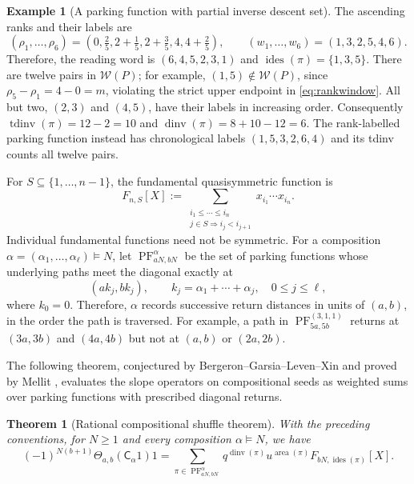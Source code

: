\documentclass[12pt,reqno]{amsart}
\numberwithin{equation}{section}
\newtheorem{theorem}{Theorem}[section]
\theoremstyle{definition}
\newtheorem*{example}{Example}
\theoremstyle{remark}
\theoremstyle{plain}
\DeclareMathOperator{\area}{area}
\DeclareMathOperator{\dinv}{dinv}
\DeclareMathOperator{\tdinv}{tdinv}
\DeclareMathOperator{\ides}{ides}
\newcommand{\Cop}{\mathsf C}
\begin{document}
\begin{example}[A parking function with partial inverse descent set]
\begin{table}[!htbp]
\caption{Labels and perturbed ranks in Figure~\ref{fig:parking}.  The rank index is the position in ascending rank order.}
\label{tab:parking}
\end{table}
\par
The ascending ranks and their labels are
\[
 (\rho_1,\ldots,\rho_6)=
 \left(0,\tfrac25,2+\tfrac15,2+\tfrac35,4,4+\tfrac25\right),
 \qquad (w_1,\ldots,w_6)=(1,3,2,5,4,6).
\]
Therefore, the reading word is $(6,4,5,2,3,1)$ and
$\ides(\pi)=\{1,3,5\}$.
There are twelve pairs in $\mathcal W(P)$; for example, $(1,5)\notin \mathcal W(P)$, since $\rho_5-\rho_1=4-0=m$, violating the strict upper endpoint in \eqref{eq:rankwindow}.  All but two, $(2,3)$ and $(4,5)$, have their labels in increasing order.
Consequently $\tdinv(\pi)=12-2=10$ and $\dinv(\pi)=8+10-12=6$.
The rank-labelled parking function instead has chronological labels
$(1,5,3,2,6,4)$ and its tdinv counts all twelve pairs.
\end{example}

For $S\subseteq\{1,\ldots,n-1\}$, the fundamental quasisymmetric function is
\[
 F_{n,S}[X]:=\sum_{\substack{i_1\le\cdots\le i_n\\j\in S\Rightarrow i_j<i_{j+1}}}
 x_{i_1}\cdots x_{i_n}.
\]
Individual fundamental functions need not be symmetric.
For a composition $\alpha=(\alpha_1,\ldots,\alpha_\ell)\models N$,
let $\operatorname{PF}_{aN,bN}^{\alpha}$ be the set of parking functions
whose underlying paths meet the diagonal exactly at
\[
 (ak_j,bk_j),\qquad k_j=\alpha_1+\cdots+\alpha_j,
 \quad 0\le j\le\ell,
\]
where $k_0=0$.  Therefore, $\alpha$ records successive return distances in
units of $(a,b)$, in the order the path is traversed.
For example, a path in $\operatorname{PF}_{5a,5b}^{(3,1,1)}$
returns at $(3a,3b)$ and $(4a,4b)$ but not at $(a,b)$ or $(2a,2b)$.

The following theorem, conjectured by Bergeron--Garsia--Leven--Xin \cite[(3.7)]{BGLX} and proved by Mellit \cite[Section~6]{Mellit}, evaluates the slope operators on compositional seeds as weighted sums over parking functions with prescribed diagonal returns.
\begin{theorem}[Rational compositional shuffle theorem]\label{thm:shuffleinput}
With the preceding conventions, for $N\ge1$ and every composition $\alpha\models N$, we have
\begin{equation}\label{eq:shuffleinput}
 (-1)^{N(b+1)}\Theta_{a,b}(\Cop_\alpha1)1
 =\sum_{\pi\in\operatorname{PF}^{\alpha}_{aN,bN}}
 q^{\dinv(\pi)}u^{\area(\pi)}F_{bN,\ides(\pi)}[X].
\end{equation}
\end{theorem}
\end{document}

